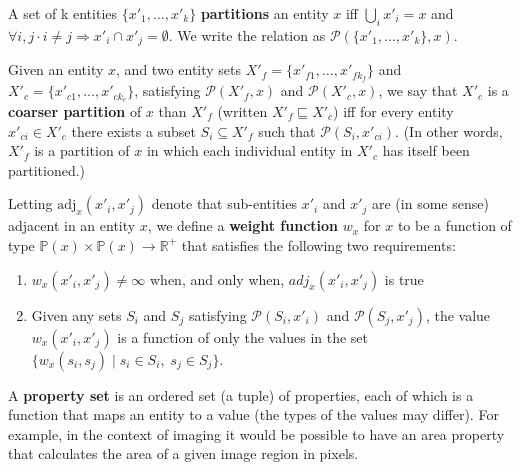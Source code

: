 \begin{definition}
A set of k entities $\{x'_1,\ldots,x'_k\}$ \textbf{partitions} an entity $x$ iff $\bigcup_i x'_i = x$ and $\forall i,j \cdot i \ne j \Rightarrow x'_i \cap x'_j = \emptyset$. We write the relation as $\mathcal{P}(\{x'_1,\ldots,x'_k\}, x)$.
\end{definition}

\begin{definition}
Given an entity $x$, and two entity sets $X'_f = \{x'_{f1},\ldots,x'_{fk_f}\}$ and $X'_c = \{x'_{c1},\ldots,x'_{ck_c}\}$, satisfying $\mathcal{P}(X'_f,x)$ and $\mathcal{P}(X'_c,x)$, we say that $X'_c$ is a \textbf{coarser partition} of $x$ than $X'_f$ (written $X'_f \sqsubseteq X'_c$) iff for every entity $x'_{ci} \in X'_c$ there exists a subset $S_i \subseteq X'_f$ such that $\mathcal{P}(S_i,x'_{ci})$. (In other words, $X'_f$ is a partition of $x$ in which each individual entity in $X'_c$ has itself been partitioned.)
\end{definition}

\begin{definition}
Letting $\mbox{adj}_x(x'_i, x'_j)$ denote that sub-entities $x'_i$ and $x'_j$ are (in some sense) adjacent in an entity $x$, we define a \textbf{weight function} $w_x$ for $x$ to be a function of type $\mathbb{P}(x) \times \mathbb{P}(x) \to \mathbb{R}^+$ that satisfies the following two requirements:
%
\begin{enumerate}

\item $w_x(x'_i, x'_j) \ne \infty$ when, and only when, $adj_x(x'_i, x'_j)$ is true

\item Given any sets $S_i$ and $S_j$ satisfying $\mathcal{P}(S_i,x'_i)$ and $\mathcal{P}(S_j,x'_j)$, the value $w_x(x'_i, x'_j)$ is a function of only the values in the set $\{w_x(s_i, s_j) \; | \; s_i \in S_i, \; s_j \in S_j\}$.

\end{enumerate}

\end{definition}

\begin{definition}
A \textbf{property set} is an ordered set (a tuple) of properties, each of which is a function that maps an entity to a value (the types of the values may differ). For example, in the context of imaging it would be possible to have an area property that calculates the area of a given image region in pixels.
\end{definition}

